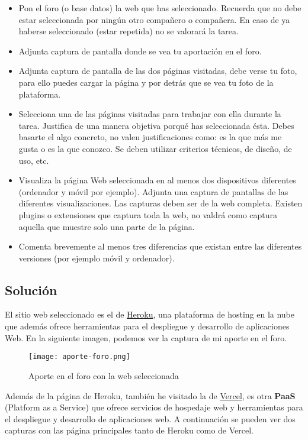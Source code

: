 \begin{itemize}
    \item Pon el foro (o base datos) la web que has seleccionado. Recuerda que no debe estar seleccionada por ningún otro compañero o compañera. En caso de ya haberse seleccionado (estar repetida) no se valorará la tarea.
    \item Adjunta captura de pantalla donde se vea tu aportación en el foro.
    \item Adjunta captura de pantalla de las dos páginas visitadas, debe verse tu foto, para ello puedes cargar la página y por detrás que se vea tu foto de la plataforma.
    \item Selecciona una de las páginas visitadas para trabajar con ella durante la tarea. Justifica de una manera objetiva porqué has seleccionada ésta. Debes basarte el algo concreto, no valen justificaciones como: es la que más me gusta o es la que conozco. Se deben utilizar criterios técnicos, de diseño, de uso, etc.
    \item Visualiza la página Web seleccionada en al menos dos dispositivos diferentes (ordenador y móvil por ejemplo). Adjunta una captura de pantallas de las diferentes visualizaciones. Las capturas deben ser de la web completa. Existen plugins o extensiones que captura toda la web, no valdrá como captura aquella que muestre solo una parte de la página.
    \item Comenta brevemente al menos tres diferencias que existan entre las diferentes versiones (por ejemplo móvil y ordenador).
\end{itemize}

\subsection{Solución}
El sitio web seleccionado es el de \href{https://www.heroku.com/}{Heroku}, una plataforma de hosting en la nube que además ofrece herramientas para el despliegue y desarrollo de aplicaciones Web. En la siguiente imagen, podemos ver la captura de mi aporte en el foro.

\begin{figure}[H]
    \centering
    \texttt{[image: aporte-foro.png]}
    \caption{Aporte en el foro con la web seleccionada}
\end{figure}

Además de la página de Heroku, también he visitado la de \href{https://vercel.com/}{Vercel}, es otra \textbf{PaaS} (Platform as a Service) que ofrece servicios de hospedaje web y herramientas para el despliegue y desarrollo de aplicaciones web. A continuación se pueden ver dos capturas con las página principales tanto de Heroku como de Vercel.

